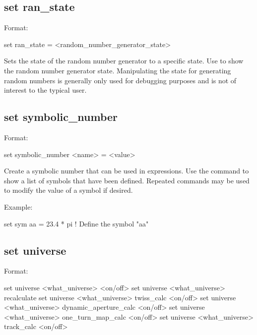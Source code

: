 {{{{{\subsection{set ran\_state}
\label{s:set.ran.state}

Format:
\begin{example}
  set ran_state = <random_number_generator_state>
\end{example}

Sets the state of the random number generator to a specific state. Use  to show the random number generator state. Manipulating the state for generating
random numbers is generally only used for debugging purposes and is not of interest to the
typical user.


\subsection{set symbolic_number}
\label{s:set.symbolic}

Format:
\begin{example}
  set symbolic_number <name> = <value>
\end{example}

Create a symbolic number that can be used in expressions. Use the  command
to show a list of symbols that have been defined. Repeated  commands may be used to modify
the value of a symbol if desired.

Example:
\begin{example}
  set sym aa = 23.4 * pi  ! Define the symbol "aa"
\end{example}


\subsection{set universe}
\label{s:set.universe}

Format:
\begin{example}
  set universe <what_universe> <on/off>
  set universe <what_universe> recalculate
  set universe <what_universe> twiss_calc <on/off>
  set universe <what_universe> dynamic_aperture_calc <on/off>
  set universe <what_universe> one_turn_map_calc <on/off>
  set universe <what_universe> track_calc <on/off>
\end{example}

}}}}}
